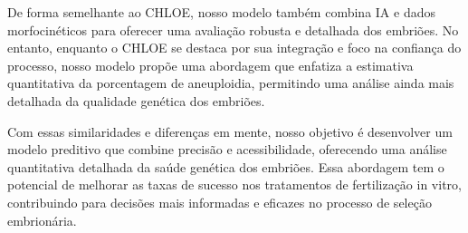 De forma semelhante ao CHLOE\texttrademark{}, nosso modelo também combina IA e dados morfocinéticos para oferecer uma avaliação robusta e detalhada dos embriões. No entanto, enquanto o CHLOE\texttrademark{} se destaca por sua integração e foco na confiança do processo, nosso modelo propõe uma abordagem que enfatiza a estimativa quantitativa da porcentagem de aneuploidia, permitindo uma análise ainda mais detalhada da qualidade genética dos embriões. 

Com essas similaridades e diferenças em mente, nosso objetivo é desenvolver um modelo preditivo que combine precisão e acessibilidade, oferecendo uma análise quantitativa detalhada da saúde genética dos embriões. Essa abordagem tem o potencial de melhorar as taxas de sucesso nos tratamentos de fertilização in vitro, contribuindo para decisões mais informadas e eficazes no processo de seleção embrionária.